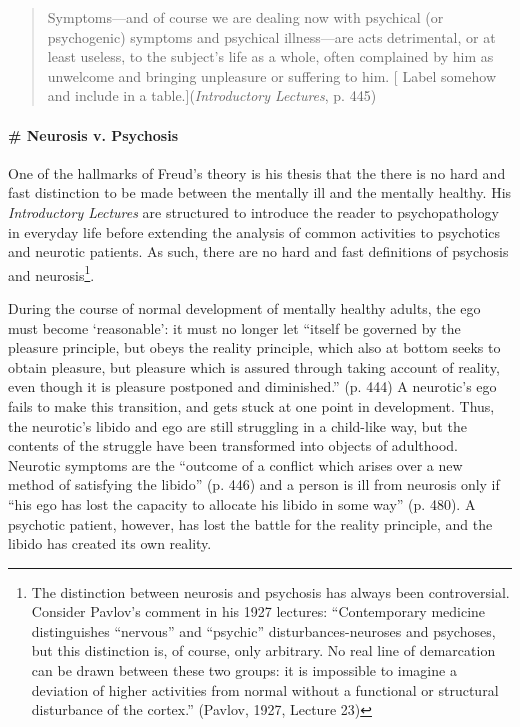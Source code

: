 \begin{quote}

Symptoms—and of course we are dealing now with psychical (or psychogenic) symptoms and psychical illness—are acts detrimental, or at least useless, to the subject's life as a whole, often complained by him as unwelcome and bringing unpleasure or suffering to him. [ Label somehow and include in a table.](\emph{Introductory Lectures}, p. 445)
\end{quote}

\paragraph{\# Neurosis v. Psychosis}
\label{neurosisv.psychosis}

One of the hallmarks of Freud's theory is his thesis that the there is no hard and fast distinction to be made between the mentally ill and the mentally healthy. His \emph{Introductory Lectures} are structured to introduce the reader to psychopathology in everyday life before extending the analysis of common activities to psychotics and neurotic patients. As such, there are no hard and fast definitions of psychosis and neurosis\footnote{The distinction between neurosis and psychosis has always been controversial. Consider Pavlov's comment in his 1927 lectures: “Contemporary medicine distinguishes ``nervous'' and ``psychic'' disturbances-neuroses and psychoses, but this distinction is, of course, only arbitrary. No real line of demarcation can be drawn between these two groups: it is impossible to imagine a deviation of higher activities from normal without a functional or structural disturbance of the cortex.” (Pavlov, 1927, Lecture 23)}.

During the course of normal development of mentally healthy adults, the ego must become `reasonable': it must no longer let “itself be governed by the pleasure principle, but obeys the reality principle, which also at bottom seeks to obtain pleasure, but pleasure which is assured through taking account of reality, even though it is pleasure postponed and diminished.” (p. 444) A neurotic's ego fails to make this transition, and gets stuck at one point in development. Thus, the neurotic's libido and ego are still struggling in a child-like way, but the contents of the struggle have been transformed into objects of adulthood. Neurotic symptoms are the “outcome of a conflict which arises over a new method of satisfying the libido” (p. 446) and a person is ill from neurosis only if “his ego has lost the capacity to allocate his libido in some way” (p. 480). A psychotic patient, however, has lost the battle for the reality principle, and the libido has created its own reality.

